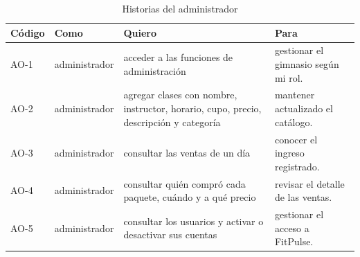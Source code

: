 \begin{table}[!t]
\caption{Historias del administrador}\label{tab:historias-admin-laura}
\centering\small
\begin{tabular}{p{}p{}p{}p{}}\toprule
Código & Como & Quiero & Para \\ \midrule
AO-1 & administrador & acceder a las funciones de administración & gestionar el gimnasio según mi rol. \\
AO-2 & administrador & agregar clases con nombre, instructor, horario, cupo, precio, descripción y categoría & mantener actualizado el catálogo. \\
AO-3 & administrador & consultar las ventas de un día & conocer el ingreso registrado. \\
AO-4 & administrador & consultar quién compró cada paquete, cuándo y a qué precio & revisar el detalle de las ventas. \\
AO-5 & administrador & consultar los usuarios y activar o desactivar sus cuentas & gestionar el acceso a FitPulse. \\
\bottomrule\end{tabular}
\end{table}
